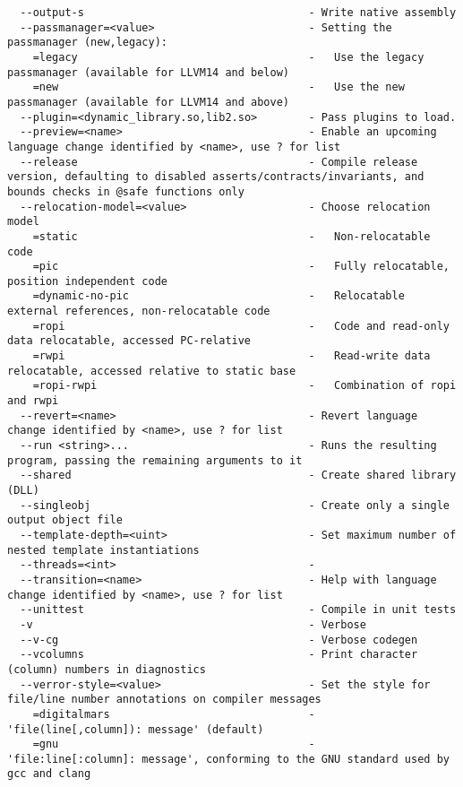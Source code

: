 \documentclass[732]{studrep}
\begin{document}
\begin{verbatim}
  --output-s                                   - Write native assembly
  --passmanager=<value>                        - Setting the passmanager (new,legacy):
    =legacy                                    -   Use the legacy passmanager (available for LLVM14 and below)
    =new                                       -   Use the new passmanager (available for LLVM14 and above)
  --plugin=<dynamic_library.so,lib2.so>        - Pass plugins to load.
  --preview=<name>                             - Enable an upcoming language change identified by <name>, use ? for list
  --release                                    - Compile release version, defaulting to disabled asserts/contracts/invariants, and bounds checks in @safe functions only
  --relocation-model=<value>                   - Choose relocation model
    =static                                    -   Non-relocatable code
    =pic                                       -   Fully relocatable, position independent code
    =dynamic-no-pic                            -   Relocatable external references, non-relocatable code
    =ropi                                      -   Code and read-only data relocatable, accessed PC-relative
    =rwpi                                      -   Read-write data relocatable, accessed relative to static base
    =ropi-rwpi                                 -   Combination of ropi and rwpi
  --revert=<name>                              - Revert language change identified by <name>, use ? for list
  --run <string>...                            - Runs the resulting program, passing the remaining arguments to it
  --shared                                     - Create shared library (DLL)
  --singleobj                                  - Create only a single output object file
  --template-depth=<uint>                      - Set maximum number of nested template instantiations
  --threads=<int>                              -
  --transition=<name>                          - Help with language change identified by <name>, use ? for list
  --unittest                                   - Compile in unit tests
  -v                                           - Verbose
  --v-cg                                       - Verbose codegen
  --vcolumns                                   - Print character (column) numbers in diagnostics
  --verror-style=<value>                       - Set the style for file/line number annotations on compiler messages
    =digitalmars                               -   'file(line[,column]): message' (default)
    =gnu                                       -   'file:line[:column]: message', conforming to the GNU standard used by gcc and clang

\end{verbatim}
\end{document}
